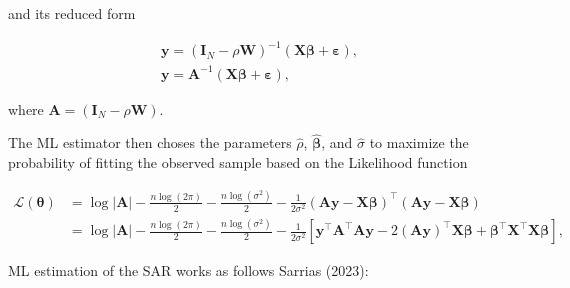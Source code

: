 \documentclass[
  letterpaper,
  DIV=11,
  numbers=noendperiod]{scrreprt}
\begin{document}
and its reduced form

\[
\begin{split}
{\boldsymbol{\mathbf{y}}} =({\boldsymbol{\mathbf{I}}_N}-\rho {\boldsymbol{\mathbf{W}}})^{-1}({\boldsymbol{\mathbf{X}}}{\boldsymbol{\mathbf{\beta}}}+ {\boldsymbol{\mathbf{\varepsilon}}}), \\
{\boldsymbol{\mathbf{y}}} =\boldsymbol{\mathbf{A}}^{-1}({\boldsymbol{\mathbf{X}}}{\boldsymbol{\mathbf{\beta}}}+ {\boldsymbol{\mathbf{\varepsilon}}}),
\end{split}
\]

where
\(\boldsymbol{\mathbf{A}} = ({\boldsymbol{\mathbf{I}}_N}-\rho {\boldsymbol{\mathbf{W}}})\).

The ML estimator then choses the parameters \(\hat\rho\),
\(\hat{\boldsymbol{\mathbf{\beta}}}\), and \(\hat\sigma\) to maximize
the probability of fitting the observed sample based on the Likelihood
function

\[
\begin{split}
\mathcal{L} (\boldsymbol{\mathbf{\theta}}) &= \log\left| \boldsymbol{\mathbf{A}}\right| - \frac{n\log(2\pi)}{2} - \frac{n\log(\sigma^2)}{2} - \frac{1}{2\sigma^2}(\boldsymbol{\mathbf{A}}\boldsymbol{\mathbf{y}}-\boldsymbol{\mathbf{X}}\boldsymbol{\mathbf{\beta}})^\top (\boldsymbol{\mathbf{A}}\boldsymbol{\mathbf{y}}-\boldsymbol{\mathbf{X}}\boldsymbol{\mathbf{\beta}}) \\
&= \log\left| \boldsymbol{\mathbf{A}}\right| - \frac{n\log(2\pi)}{2} - \frac{n\log(\sigma^2)}{2} - \frac{1}{2\sigma^2}\left[\boldsymbol{\mathbf{y}}^\top \boldsymbol{\mathbf{A}}^\top\boldsymbol{\mathbf{A}}\boldsymbol{\mathbf{y}} - 2\left(\boldsymbol{\mathbf{A}}\boldsymbol{\mathbf{y}}\right)^\top\boldsymbol{\mathbf{X}}\boldsymbol{\mathbf{\beta }}+ \boldsymbol{\mathbf{\beta}}^\top\boldsymbol{\mathbf{X}}^\top\boldsymbol{\mathbf{X}}\boldsymbol{\mathbf{\beta}}\right],
\end{split}
\]

ML estimation of the SAR works as follows Sarrias (2023):
\end{document}
